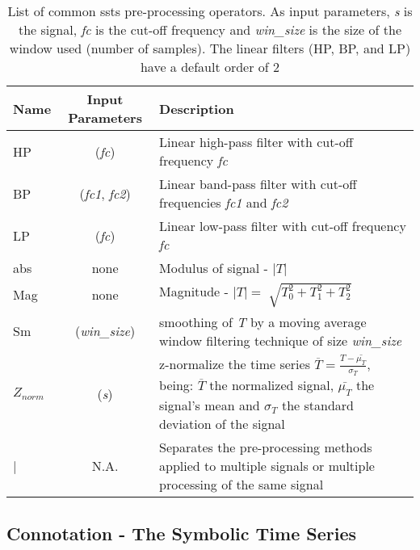 \begin{center}
\begin{table}
	\centering
    \setlength{\tabcolsep}{3pt}
	\renewcommand{\arraystretch}{1.5}
	\caption{List of common \gls{ssts} pre-processing operators. As input parameters, \textit{s} is the signal, \textit{fc} is the cut-off frequency and \textit{win\_size} is the size of the window used (number of samples). The linear filters (HP, BP, and LP) have a default order of 2}
	~\\~
	\label{tab:preprocess}
	\begin{tabular}{lcP}
        \toprule[0.5mm]
		Name & Input Parameters & Description\\
        \midrule[0.3mm]
		HP & (\textit{fc}) & Linear high-pass filter with cut-off frequency \textit{fc}\\
        \midrule
		BP & (\textit{fc1}, \textit{fc2}) & Linear band-pass filter with cut-off frequencies \textit{fc1} and \textit{fc2}\\ 
        \midrule
 		LP & (\textit{fc}) & Linear low-pass filter with cut-off frequency \textit{fc}\\
        \midrule
        abs & none & Modulus of signal - $|T|$\\
        \midrule
        Mag & none & Magnitude - $|T| = \sqrt[]{T_0^2 + T_1^2 + T_2^2}$\\
        \midrule
        Sm &  (\textit{win\_size}) & smoothing of \textit{T} by a moving average window filtering technique of size \textit{win\_size}\\
        \midrule
        $Z_{norm}$ & (\textit{s}) & z-normalize the time series $\overline{T} = \frac{T-\bar{\mu_T}}{\sigma_T}$, being: $\overline{T}$ the normalized signal, $\bar{\mu_T}$ the signal's mean and $\sigma_T$ the standard deviation of the signal\\
        \midrule
        | & N.A. & Separates the pre-processing methods applied to multiple signals or multiple processing of the same signal\\
        \bottomrule[0.5mm]
 	\hline
	\end{tabular}
\end{table}
\end{center}

\subsection{Connotation - The Symbolic Time Series}
\label{subsec:symbolic_connotation}


